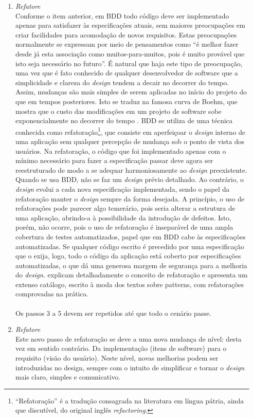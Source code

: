 \documentclass[a4paper,abntfigtabnum,noindentfirst]{abnt}
\begin{document}
\begin{enumerate}
\item \textit{Refatore}\\
Conforme o item anterior, em BDD todo código deve ser implementado apenas para satisfazer às especificações atuais, sem maiores preocupações em criar facilidades para acomodação de novos requisitos. Estas preocupações normalmente se expressam por meio de pensamentos como ``é melhor fazer desde já esta associação como muitos-para-muitos, pois é muito provável que isto seja necessário no futuro''. É natural que haja este tipo de preocupação, uma vez que é fato conhecido de qualquer desenvolvedor de software que a simplicidade e clareza do \textit{design} tendem a decair no decorrer do tempo. Assim, mudanças são mais simples de serem aplicadas no início do projeto do que em tempos posteriores. Isto se traduz na famosa curva de Boehm, que mostra que o custo das modificações em um projeto de software sobe exponencialmente no decorrer do tempo \cite{Boehm1981}. BDD se utiliza de uma técnica conhecida como refatoração\footnote{``Refatoração'' é a tradução consagrada na literatura em língua pátria, ainda que discutível, do original inglês \textit{refactoring}.}, que consiste em aperfeiçoar o \textit{design} interno de uma aplicação sem qualquer percepção de mudança sob o ponto de vista dos usuários. Na refatoração, o código que foi implementado apenas com o mínimo necessário para fazer a especificação passar deve agora ser reestruturado de modo a se adequar harmoniosamente ao \textit{design} preexistente. Quando se usa BDD, não se faz um \textit{design} prévio detalhado. Ao contrário, o \textit{design} evolui \cite{XP2ndEd} \cite{EmergentDesign} a cada nova especificação implementada, sendo o papel da refatoração manter o \textit{design} sempre da forma desejada. A princípio, o uso de refatorações pode parecer algo temerário, pois seria alterar a estrutura de uma aplicação, abrindo-a à possibilidade da introdução de defeitos. Isto, porém, não ocorre, pois o uso de refatoração é inseparável de uma ampla cobertura de testes automatizados, papel que em BDD cabe às especificações automatizadas. Se qualquer código escrito é precedido por uma especificação que o exija, logo, todo o código da aplicação está coberto por especificações automatizadas, o que dá uma generosa margem de segurança para a melhoria do \textit{design}.  explicam detalhadamente o conceito de refatoração e apresenta um extenso catálogo, escrito à moda dos textos sobre patterns, com refatorações comprovadas na prática.\\
\\
Os passos 3 a 5 devem ser repetidos até que todo o cenário passe.

\item \textit{Refatore}\\
Este novo passo de refatoração se deve a uma nova mudança de nível: desta vez em sentido contrário. Da implementação (itens de software) para o requisito (visão do usuário). Neste nível, novas melhorias podem ser introduzidas no design, sempre com o intuito de simplificar e tornar o \textit{design} mais claro, simples e comunicativo.

\end{enumerate}
\end{document}
